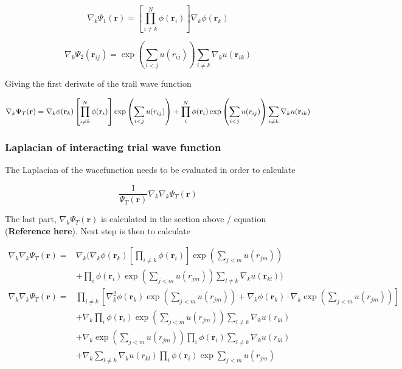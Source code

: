 \documentclass[
]{article}
\begin{document}
\[
\nabla_k \Psi_1(\mathbf{r}) = \left[\prod_ {i\ne k}^N \phi(\mathbf{r}_i) \right] \nabla_k \phi(\mathbf{r}_k)
\]

\[
\nabla_k \Psi_2(\mathbf{r}_ {ij}) = \exp {\left (\sum_ {i<j}u(r_{ij})\right)}  \sum_ {i \ne k} \nabla_k  u(\mathbf{r}_{ik})
\]

Giving the first derivate of the trail wave function

\[
\nabla_k \Psi_T(\mathbf{r}) = \nabla_k \phi(\mathbf{r}_ k) \left [\prod_ {i\ne k}^N \phi(\mathbf{r}_ i) \right] \exp {\left (\sum_ {i<j}u(r_{ij})\right)} \\ +
 \prod_i^N \phi (\mathbf{r}_ i) \exp{ \left( \sum_{i<j} u(r_{ij}) \right)}  \sum_ {i \ne k} \nabla_k  u(\mathbf{r}_{ik})
\]

\hypertarget{sec:trial_wf_laplacian}{%
\subsubsection{Laplacian of interacting trial wave
function}\label{sec:trial_wf_laplacian}}

The Laplacian of the wacefunction needs to be evaluated in order to
calculate

\[
\frac{1}{\Psi_T(\mathbf {r})} \nabla_k \nabla_k \Psi_T(\mathbf{r})
\]

The last part, \(\nabla_k \Psi_T(\mathbf{r})\) is calculated in the
section above / equation (\textbf{Reference here}). Next step is then to
calculate

\begin{align*}
\nabla_k \nabla_k \Psi_T(\mathbf{r}) = &\nabla_k \bigg( \nabla_k \phi(\mathbf r_k) \left [\prod_{i\ne k} \phi(\mathbf r_i) \right] \exp{\left (\sum_{j<m}u(r_{jm})\right)} \\
 &+ \prod_i \phi (\mathbf r_i) \exp{\left(\sum_{j<m} u(r_{jm}) \right)}  \sum_{l \ne k} \nabla_k  u(\mathbf r_{kl}) \bigg) \\
\nabla_k \nabla_k \Psi_T(\mathbf r) = &\prod_{i\ne k} \left[ \nabla_k^2 \phi(\mathbf r_k) \exp{\left(\sum_{j<m} u(r_{jm})\right)} + \nabla_k \phi(\mathbf r_k) \cdot  \nabla_k \exp{\left( \sum_{j < m} u(r_{jm})\right)} \right] \\ &+ \nabla_k \prod_i \phi (\mathbf r_i) \exp{\left (\sum _{j<m} u(r_{jm})\right)}\sum_{l \ne k} \nabla_k u(r_{kl}) \\ &+
\nabla_k \exp{\left(\sum_{j < m} u(r_{jm})\right)}\prod_i \phi(\mathbf{r}_i) \sum_{l \ne k} \nabla_k u(r_{kl}) \\ &+ \nabla_k \sum_{l \ne k} \nabla_k u (r_{kl}) \prod_i \phi (\mathbf{r}_i) \exp{\sum_{j < m} u (r_{jm})}
\end{align*}
\end{document}
